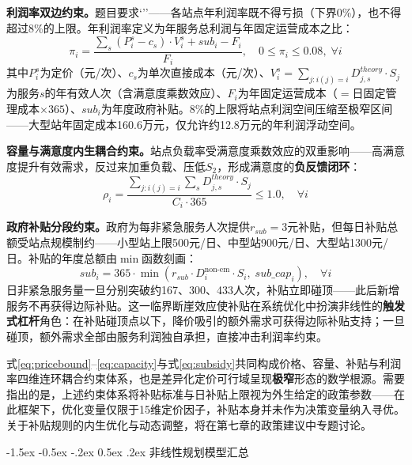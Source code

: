 \documentclass[zihao=-4]{cumcmthesis}
\makeatletter
\renewcommand\subsubsection{\@startsection{subsubsection}{3}{\z@}%
    {-1.5ex \@plus -0.5ex \@minus -.2ex}%
    {0.5ex \@plus .2ex}%
    {\normalfont\normalsize\bfseries}}
\makeatother
\begin{document}
\textbf{利润率双边约束。}题目要求\lq{}\rq\rq——各站点年利润率既不得亏损（下界0\%），也不得超过8\%的上限。年利润率定义为年服务总利润与年固定运营成本之比：
\begin{equation}
\pi_i = \frac{\sum_{s} (P_i^s - c_s) \cdot V_i^s + sub_i - F_i}{F_i}, \quad 0 \le \pi_i \le 0.08,\; \forall i
\label{eq:profitbound}
\end{equation}
其中$P_i^s$为定价（元/次）、$c_s$为单次直接成本（元/次）、$V_i^s = \sum_{j: i(j)=i} D_{j,s}^{theory} \cdot S_j$为服务$s$的年有效人次（含满意度乘数效应）、$F_i$为年固定运营成本（$=$日固定管理成本$\times 365$）、$sub_i$为年度政府补贴。8\%的上限将站点利润空间压缩至极窄区间——大型站年固定成本160.6万元，仅允许约12.8万元的年利润浮动空间。

\textbf{容量与满意度内生耦合约束。}站点负载率受满意度乘数效应的双重影响——高满意度提升有效需求，反过来加重负载、压低$S_2$，形成满意度的\textbf{负反馈闭环}：
\begin{equation}
\rho_i = \frac{\sum_{j: i(j)=i} \sum_{s} D_{j,s}^{theory} \cdot S_j}{C_i \cdot 365} \le 1.0, \quad \forall i
\label{eq:capacity}
\end{equation}

\textbf{政府补贴分段约束。}政府为每非紧急服务人次提供$r_{sub}=3$元补贴，但每日补贴总额受站点规模制约——小型站上限500元/日、中型站900元/日、大型站1300元/日。补贴的年度总额由$\min$函数刻画：
\begin{equation}
sub_i = 365 \cdot \min\left(r_{sub} \cdot D_i^{\text{non-em}} \cdot S_i,\; sub\_cap_i\right), \quad \forall i
\label{eq:subsidy}
\end{equation}
日非紧急服务量一旦分别突破约167、300、433人次，补贴立即碰顶——此后新增服务不再获得边际补贴。这一临界断崖效应使补贴在系统优化中扮演非线性的\textbf{触发式杠杆}角色：在补贴碰顶点以下，降价吸引的额外需求可获得边际补贴支持；一旦碰顶，额外需求全部由服务利润独自承担，直接冲击利润率约束。

式\eqref{eq:pricebound}--\eqref{eq:capacity}与式\eqref{eq:subsidy}共同构成价格、容量、补贴与利润率四维连环耦合约束体系，也是差异化定价可行域呈现\textbf{极窄}形态的数学根源。需要指出的是，上述约束体系将补贴标准与日补贴上限视为外生给定的政策参数——在此框架下，优化变量仅限于15维定价因子，补贴本身并未作为决策变量纳入寻优。关于补贴规则的内生优化与动态调整，将在第七章的政策建议中专题讨论。

\subsubsection{非线性规划模型汇总}
\end{document}
